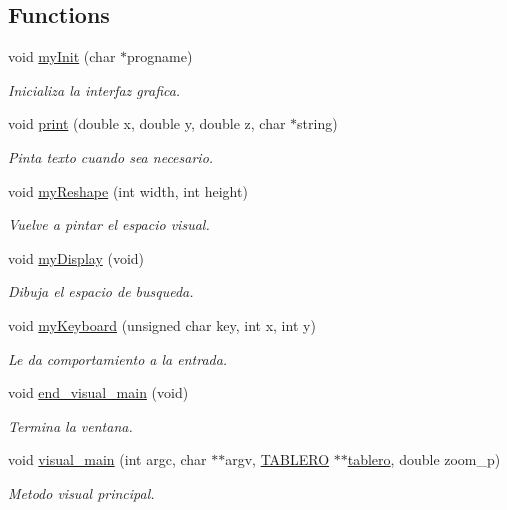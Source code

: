 \subsection*{Functions}
\begin{DoxyCompactItemize}
\item 
void \hyperlink{interfaz-grafica_8h_a2db9d4ba828a33f3d95cb840b12aa58d}{my\+Init} (char $\ast$progname)
\begin{DoxyCompactList}\small\item\em Inicializa la interfaz grafica. \end{DoxyCompactList}\item 
void \hyperlink{interfaz-grafica_8h_aa50584771327fb90979684f968197158}{print} (double x, double y, double z, char $\ast$string)
\begin{DoxyCompactList}\small\item\em Pinta texto cuando sea necesario. \end{DoxyCompactList}\item 
void \hyperlink{interfaz-grafica_8h_a8fd3d45fd23b25badf76731599983fc7}{my\+Reshape} (int width, int height)
\begin{DoxyCompactList}\small\item\em Vuelve a pintar el espacio visual. \end{DoxyCompactList}\item 
void \hyperlink{interfaz-grafica_8h_ac158bfc1571fb83c31d7035c8497a5a3}{my\+Display} (void)
\begin{DoxyCompactList}\small\item\em Dibuja el espacio de busqueda. \end{DoxyCompactList}\item 
void \hyperlink{interfaz-grafica_8h_a723d4409337490d7963ce39bc9a6ec61}{my\+Keyboard} (unsigned char key, int x, int y)
\begin{DoxyCompactList}\small\item\em Le da comportamiento a la entrada. \end{DoxyCompactList}\item 
void \hyperlink{interfaz-grafica_8h_a343542b85d5e7ca60f02b99f0231f526}{end\+\_\+visual\+\_\+main} (void)
\begin{DoxyCompactList}\small\item\em Termina la ventana. \end{DoxyCompactList}\item 
void \hyperlink{interfaz-grafica_8h_a75a94e8110ac0ab4efe7bb0a9a1f0772}{visual\+\_\+main} (int argc, char $\ast$$\ast$argv, \hyperlink{tablero_8h_acbb1e9c862ccf810af77512ddb019a82}{T\+A\+B\+L\+E\+RO} $\ast$$\ast$\hyperlink{structtablero}{tablero}, double zoom\+\_\+p)
\begin{DoxyCompactList}\small\item\em Metodo visual principal. \end{DoxyCompactList}\end{DoxyCompactItemize}
